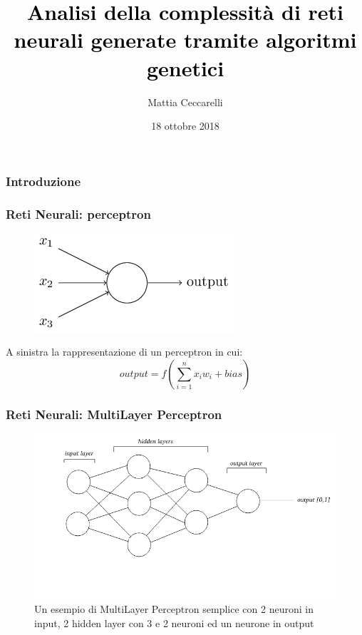 \documentclass{beamer}
\begin{document}
\title{\textcolor{black}{Analisi della complessità di reti neurali generate tramite algoritmi genetici}}
\author{Mattia Ceccarelli}
\date{18 ottobre 2018}

\begin{frame}
 \maketitle
\end{frame}

\begin{frame}
 \frametitle{Introduzione}
\end{frame}

\begin{frame}
 \frametitle{Reti Neurali: perceptron}
 \begin{figure}
   \includegraphics[scale = 0.5]{images/perceptron.png}
   \caption{ }
  \end{figure}
  A sinistra la rappresentazione di un perceptron in cui:
    \begin{equation}
     output = f(\sum_{i = 1}^{n}x_{i}w_{i} + bias)   
    \end{equation}
\end{frame}

\begin{frame}
\frametitle{Reti Neurali: MultiLayer Perceptron}
 \begin{figure}
  \includegraphics[scale = 0.4]{images/MLPClass.png}
  \caption{Un esempio di MultiLayer Perceptron semplice con 2 neuroni in input, 2 hidden layer con 3 e 2 neuroni ed un neurone in output}
 \end{figure}
\end{frame}
\end{document}
